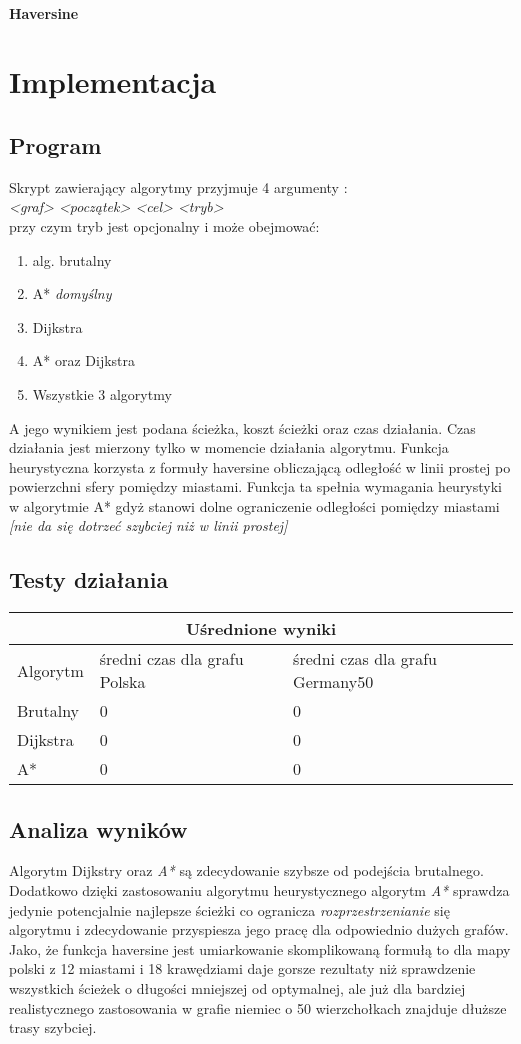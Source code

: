 \documentclass[11pt]{article} %
\begin{document}
\paragraph{Haversine}

\section{Implementacja}
\subsection{Program}
Skrypt zawierający algorytmy przyjmuje 4 argumenty : \\ 
\textsl{<graf> <początek> <cel> <tryb>}\\
przy czym tryb jest opcjonalny i może obejmować:
\begin{enumerate}
\item
alg. brutalny
\item
A* \textsl{domyślny}
\item
Dijkstra
\item
A* oraz Dijkstra
\item
Wszystkie 3 algorytmy
\end{enumerate}
A jego wynikiem jest podana ścieżka, koszt ścieżki oraz czas działania. Czas działania jest mierzony tylko w momencie działania algorytmu. Funkcja heurystyczna korzysta z formuły haversine obliczającą odległość w linii prostej po powierzchni sfery pomiędzy miastami. Funkcja ta spełnia wymagania heurystyki w algorytmie A* gdyż stanowi dolne ograniczenie odległości pomiędzy miastami \textsl{[nie da się dotrzeć szybciej niż w linii prostej]}
\subsection{Testy działania}
\begin{table}[h!]
\centering
\begin{tabular}{ ||p{3cm}||p{5cm}|p{5cm}||  }
\hline
\multicolumn{3}{|c|}{Uśrednione wyniki} \\
\hline
Algorytm & średni czas dla grafu Polska & średni czas dla grafu Germany50 \\
\hline
Brutalny & 0 &0 \\
Dijkstra & 0 &0 \\
A* & 0 &0 \\
\hline
\end{tabular}
\end{table}
\subsection{Analiza wyników}
Algorytm Dijkstry oraz \textsl{A*} są zdecydowanie szybsze od podejścia brutalnego. Dodatkowo dzięki zastosowaniu algorytmu heurystycznego algorytm \textsl{A*} sprawdza jedynie potencjalnie najlepsze ścieżki co ogranicza \textsl{rozprzestrzenianie} się algorytmu i zdecydowanie przyspiesza jego pracę dla odpowiednio dużych grafów. Jako, że funkcja haversine jest umiarkowanie skomplikowaną formułą to dla mapy polski z 12 miastami i 18 krawędziami daje gorsze rezultaty niż sprawdzenie wszystkich ścieżek o długości mniejszej od optymalnej, ale już dla bardziej realistycznego zastosowania w grafie niemiec o 50 wierzchołkach znajduje dłuższe trasy szybciej.
\end{document}
